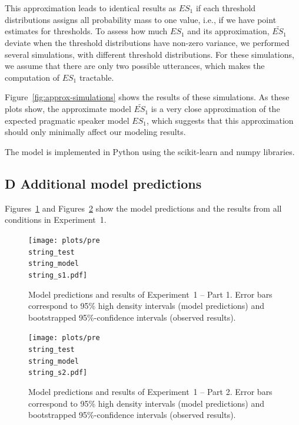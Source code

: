\documentclass[man, floatsintext]{apa6}
\begin{document}
This approximation leads to identical results as $ES_1$ if each threshold distributions assigns all probability mass to one value, 
i.e., if we have point estimates for thresholds. To assess how much $ES_1$ and its approximation, $\widetilde{ES_1}$ deviate when 
the threshold distributions have non-zero variance, we performed several simulations, with different threshold distributions. For these
simulations, we assume that there are only two possible utterances, which makes the computation of $ES_1$ tractable.

Figure~\ref{fig:approx-simulations} shows the results of these simulations. As these plots show, the approximate model $\widetilde{ES_1}$ is a very close approximation of the expected
pragmatic speaker model $ES_1$, which suggests that this approximation should only minimally affect our modeling results. 

The model is implemented in Python using the scikit-learn \parencite{Scikit2011} and numpy \parencite{vanderWalt2011} libraries.

\pagebreak

\subsection*{D Additional model predictions}

Figures~\ref{fig:norming-results-model-1} and Figures~\ref{fig:norming-results-model-2} show the model predictions and the results from all conditions in Experiment~1. 

\begin{figure}[h!]
\texttt{[image: plots/pre\\string\_test\\string\_model\\string\_s1.pdf]}
\caption{Model predictions and results of Experiment~1 -- Part 1. Error bars correspond to 95\% high density intervals (model predictions) and bootstrapped 95\%-confidence intervals (observed results). \label{fig:norming-results-model-1}}

\end{figure}

\begin{figure}[h!]
\texttt{[image: plots/pre\\string\_test\\string\_model\\string\_s2.pdf]}
\caption{Model predictions and results of Experiment~1  -- Part 2. Error bars correspond to 95\% high density intervals (model predictions) and bootstrapped 95\%-confidence intervals (observed results). \label{fig:norming-results-model-2}}

\end{figure}
\end{document}
